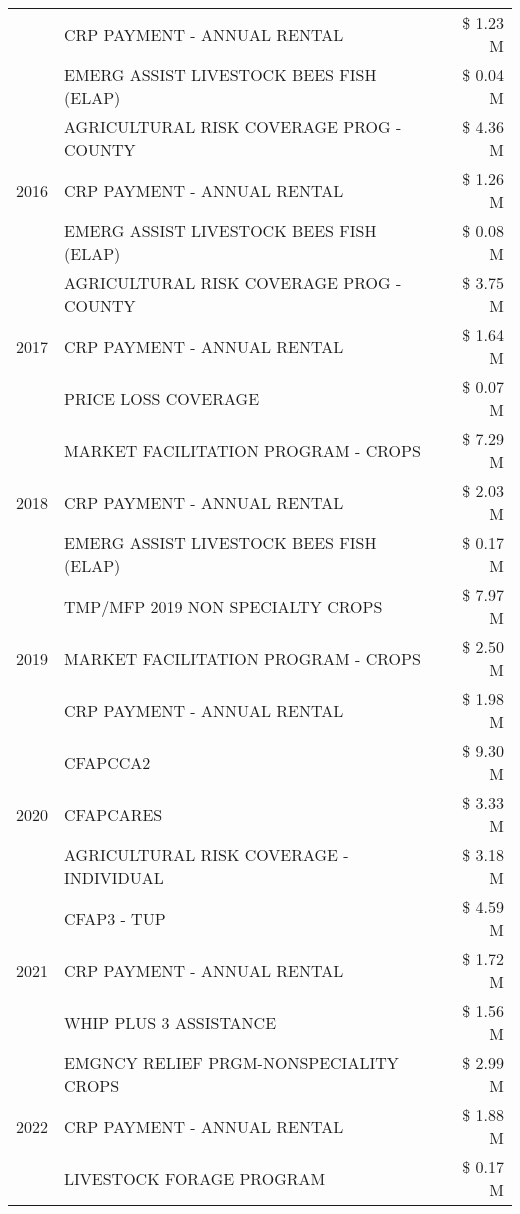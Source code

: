 \begin{tabular}{llr}
 & CRP PAYMENT - ANNUAL RENTAL & \$ 1.23 M \\
 & EMERG ASSIST LIVESTOCK BEES FISH (ELAP) & \$ 0.04 M \\
\cline{1-3}
\multirow[t]{3}{*}{2016} & AGRICULTURAL RISK COVERAGE PROG - COUNTY & \$ 4.36 M \\
 & CRP PAYMENT - ANNUAL RENTAL & \$ 1.26 M \\
 & EMERG ASSIST LIVESTOCK BEES FISH (ELAP) & \$ 0.08 M \\
\cline{1-3}
\multirow[t]{3}{*}{2017} & AGRICULTURAL RISK COVERAGE PROG - COUNTY & \$ 3.75 M \\
 & CRP PAYMENT - ANNUAL RENTAL & \$ 1.64 M \\
 & PRICE LOSS COVERAGE & \$ 0.07 M \\
\cline{1-3}
\multirow[t]{3}{*}{2018} & MARKET FACILITATION PROGRAM - CROPS & \$ 7.29 M \\
 & CRP PAYMENT - ANNUAL RENTAL & \$ 2.03 M \\
 & EMERG ASSIST LIVESTOCK BEES FISH (ELAP) & \$ 0.17 M \\
\cline{1-3}
\multirow[t]{3}{*}{2019} & TMP/MFP 2019 NON SPECIALTY CROPS & \$ 7.97 M \\
 & MARKET FACILITATION PROGRAM - CROPS & \$ 2.50 M \\
 & CRP PAYMENT - ANNUAL RENTAL & \$ 1.98 M \\
\cline{1-3}
\multirow[t]{3}{*}{2020} & CFAPCCA2 & \$ 9.30 M \\
 & CFAPCARES & \$ 3.33 M \\
 & AGRICULTURAL RISK COVERAGE - INDIVIDUAL & \$ 3.18 M \\
\cline{1-3}
\multirow[t]{3}{*}{2021} & CFAP3 - TUP & \$ 4.59 M \\
 & CRP PAYMENT - ANNUAL RENTAL & \$ 1.72 M \\
 & WHIP PLUS 3 ASSISTANCE & \$ 1.56 M \\
\cline{1-3}
\multirow[t]{3}{*}{2022} & EMGNCY RELIEF PRGM-NONSPECIALITY CROPS & \$ 2.99 M \\
 & CRP PAYMENT - ANNUAL RENTAL & \$ 1.88 M \\
 & LIVESTOCK FORAGE PROGRAM & \$ 0.17 M \\
\cline{1-3}
\bottomrule
\end{tabular}
